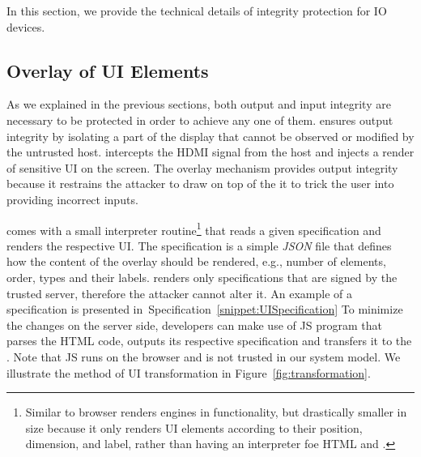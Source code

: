 In this section, we provide the technical details of \name integrity protection for IO devices. 



\subsection{\device Overlay of UI Elements}
\label{sec:systemDesign:transformation}

As we explained in the previous sections, both output and input integrity are necessary to be protected in order to achieve any one of them. \name ensures output integrity by isolating a part of the display that cannot be observed or modified by the untrusted host. \device intercepts the HDMI signal from the host and injects a render of sensitive UI on the screen. The overlay mechanism provides output integrity because it restrains the attacker to draw on top of the it to trick the user into providing incorrect inputs. 

\device comes with a small interpreter routine\footnote{Similar to browser renders engines in functionality, but drastically smaller in size because it only renders UI elements according to their position, dimension, and label, rather than having an interpreter foe HTML and \js.} that reads a given specification and renders the respective UI. The specification is a simple \emph{JSON} file that defines how the content of the overlay should be rendered, e.g., number of elements, order, types and their labels. \device renders only specifications that are signed by the trusted server, therefore the attacker cannot alter it. An example of a specification is presented in~Specification~\ref{snippet:UISpecification} To minimize the changes on the server side, developers can make use of \name JS program that parses the HTML code, outputs its respective specification and transfers it to the \device.
Note that \name JS runs on the browser and is not trusted in our system model. We illustrate the method of UI transformation in Figure~\ref{fig:transformation}. 

